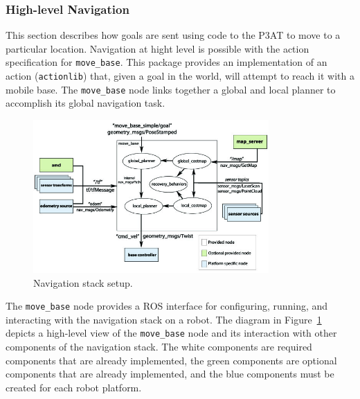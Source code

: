 \subsubsection*{High-level Navigation}
This section describes how goals are sent using code to the P3AT to move to a particular location. Navigation at hight level is possible with the action specification for \texttt{move\_base}. This package provides an implementation of an action (\texttt{actionlib}) that, given a goal in the world, will attempt to reach it with a mobile base. The \texttt{move\_base} node links together a global and local planner to accomplish its global navigation task.

\begin{figure}[h!]
\centering
\includegraphics[width=9cm]{Figures/Misc/Navigation_Stack.jpg}
\caption{Navigation stack setup.}\label{fig:navigation_stack}
\end{figure}
The \texttt{move\_base} node provides a ROS interface for configuring, running, and interacting with the navigation stack on a robot. The diagram in Figure~\ref{fig:navigation_stack} depicts a high-level view of the \texttt{move\_base} node and its interaction with other components of the navigation stack. The white components are required components that are already implemented, the green components are optional components that are already implemented, and the blue components must be created for each robot platform.

